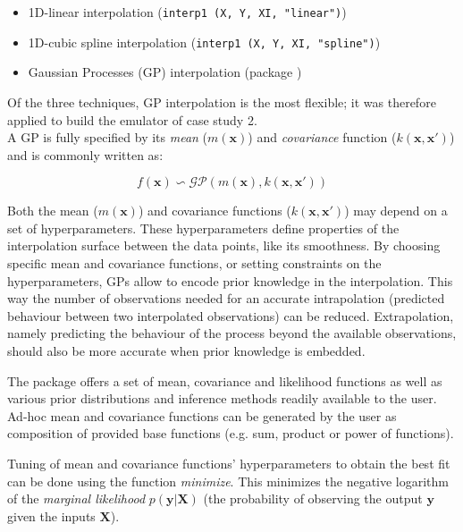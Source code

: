 \begin{itemize}
\itemsep0em
  \item 1D-linear interpolation (\texttt{interp1 (X, Y, XI, "linear")})
  \item 1D-cubic spline interpolation (\texttt{interp1 (X, Y, XI, "spline")})
  \item Gaussian Processes (GP) interpolation (package )
\end{itemize}

Of the three techniques, GP interpolation is the most flexible; it was therefore applied to build the emulator of case study 2.\\

A GP is fully specified by its \emph{mean} ($m(\bm{x})$) and \emph{covariance} function ($k(\bm{x},\bm{x}')$) \autocite{rasmussen_gaussian_2006} and is commonly written as:

\begin{equation}
  f(\bm{x}) \backsim \mathcal{GP}\left(m(\bm{x}), k(\bm{x},\bm{x}')\right)
\end{equation}

Both the mean ($m(\bm{x})$) and covariance functions ($k(\bm{x},\bm{x}')$) may depend on a set of hyperparameters. These hyperparameters define properties of the interpolation surface between the data points, like its smoothness.
By choosing specific mean and covariance functions, or setting constraints on the hyperparameters, GPs allow to encode prior knowledge in the interpolation.
This way the number of observations needed for an accurate intrapolation (predicted behaviour between two interpolated observations) can be reduced.
Extrapolation, namely predicting the behaviour of the process beyond the available observations, should also be more accurate when prior knowledge is embedded.

The package  offers a set of mean, covariance and likelihood functions as well as various prior distributions and inference methods readily available to the user.
Ad-hoc mean and covariance functions can be generated by the user as composition of provided base functions (e.g. sum, product or power of functions).

Tuning of mean and covariance functions' hyperparameters to obtain the best fit can be done using the function \emph{minimize}. This minimizes the negative logarithm of the \emph{marginal likelihood} $p(\bm{y}\vert \bm{X})$ (the probability of observing the output $\bm{y}$ given the inputs $\bm{X}$).
 
